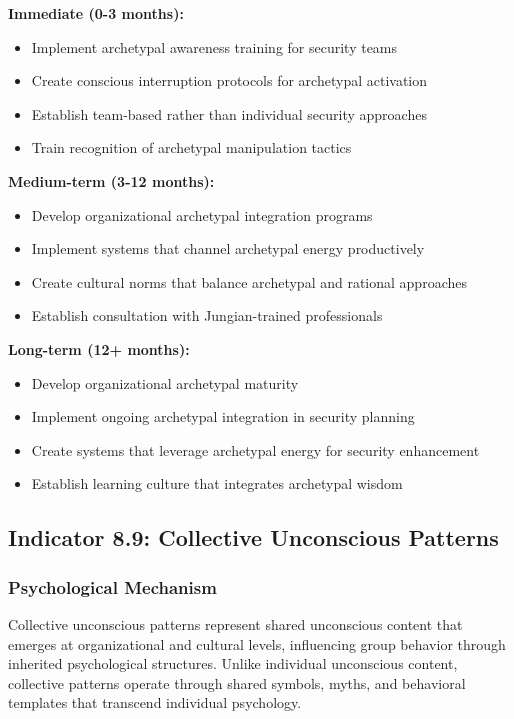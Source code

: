 \documentclass[11pt,a4paper]{article}
\begin{document}
\textbf{Immediate (0-3 months):}
\begin{itemize}
\item Implement archetypal awareness training for security teams
\item Create conscious interruption protocols for archetypal activation
\item Establish team-based rather than individual security approaches
\item Train recognition of archetypal manipulation tactics
\end{itemize}

\textbf{Medium-term (3-12 months):}
\begin{itemize}
\item Develop organizational archetypal integration programs
\item Implement systems that channel archetypal energy productively
\item Create cultural norms that balance archetypal and rational approaches
\item Establish consultation with Jungian-trained professionals
\end{itemize}

\textbf{Long-term (12+ months):}
\begin{itemize}
\item Develop organizational archetypal maturity
\item Implement ongoing archetypal integration in security planning
\item Create systems that leverage archetypal energy for security enhancement
\item Establish learning culture that integrates archetypal wisdom
\end{itemize}

\subsection{Indicator 8.9: Collective Unconscious Patterns}

\subsubsection{Psychological Mechanism}

Collective unconscious patterns represent shared unconscious content that emerges at organizational and cultural levels, influencing group behavior through inherited psychological structures\cite{jung1969}. Unlike individual unconscious content, collective patterns operate through shared symbols, myths, and behavioral templates that transcend individual psychology.
\end{document}
